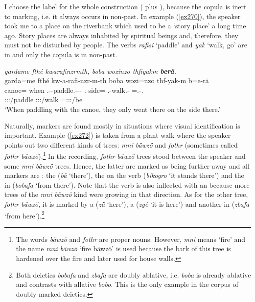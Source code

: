 I choose the label   for the whole construction (  plus ), because the copula is inert to  marking, i.e. it always occurs in non-past. In example (\ref{ex270}), the speaker took me to a place on the riverbank which used to be a `story place' a long time ago. Story places are always inhabited by spiritual beings and, therefore, they must not be disturbed by people. The verbs \emph{rafisi} `paddle' and \emph{yak} `walk, go' are in   and only the copula is in non-past.

\begin{exe}
	\ex \emph{gardame fthé kwarafinzrmth, boba wozinzo thfiyakm \textbf{berä}.}\\
	\glll garda=me fthé kw-a-rafi-nzr-m-th boba wozi=nzo thf-yak-m b=e-rä\\
	canoe=\Ins{} when \M.\Betaone-\Vc-paddle.\Ext-\Ndu-\Dur-\Stnsg{} \Med.\Abl{} side=\Only{} \Stnsg.\Betatwo-walk.\Ext-\Dur{} \Med=\Stnsg.\Alph-\Cop.\Ndu\\
	{} {} \footnotesize{\Stpl:\Sbj:\Pst:\Dur/paddle} {} {} \footnotesize{\Stpl:\Sbj:\Pst:\Dur/walk} \footnotesize{\Med=\Stpl:\Sbj:\Nonpast:\Ipfv/be}\\
	\trans `When paddling with the canoe, they only went there on the side there.'\\
	\label{ex270}
\end{exe}

Naturally,  markers are found mostly in situations where visual identification is important. Example (\ref{ex272}) is taken from a plant walk where the speaker points out two different kinds of trees: \emph{mni bäwzö} and \emph{fothr} (sometimes called \emph{fothr bäwzö}).\footnote{The words \emph{bäwzö} and \emph{fothr} are proper nouns. However, \emph{mni} means `fire' and the name \emph{mni bäwzö} `fire bäwzö' is used because the bark of this tree is hardened over the fire and later used for house walls.} In the recording, \emph{fothr bäwzö} trees stood between the speaker and some \emph{mni bäwzö} trees. Hence, the latter are marked as being further away and all  markers are : the  (\emph{bä} `there'), the  on the verb (\emph{bikogro} `it stands there') and the  in   (\emph{bobafa} `from there'). Note that the verb is also inflected with an  because more trees of the \emph{mni bäwzö} kind were growing in that direction. As for the other tree, \emph{fothr bäwzö}, it is marked by a   (\emph{zä} `here'), a    (\emph{zyé} `it is here') and another   in   (\emph{zbafa} `from here').\footnote{Both deictics \emph{bobafa} and \emph{zbafa} are doubly ablative, i.e. \emph{boba} is already ablative and contrasts with allative \emph{bobo}. This is the only example in the corpus of doubly marked deictics.}

